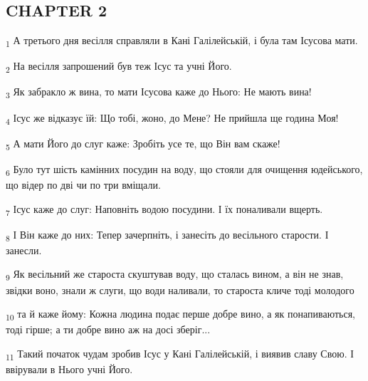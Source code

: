 \subsection{CHAPTER 2}
\begin{tcolorbox}
\textsubscript{1} А третього дня весілля справляли в Кані Галілейській, і була там Ісусова мати.
\end{tcolorbox}
\begin{tcolorbox}
\textsubscript{2} На весілля запрошений був теж Ісус та учні Його.
\end{tcolorbox}
\begin{tcolorbox}
\textsubscript{3} Як забракло ж вина, то мати Ісусова каже до Нього: Не мають вина!
\end{tcolorbox}
\begin{tcolorbox}
\textsubscript{4} Ісус же відказує їй: Що тобі, жоно, до Мене? Не прийшла ще година Моя!
\end{tcolorbox}
\begin{tcolorbox}
\textsubscript{5} А мати Його до слуг каже: Зробіть усе те, що Він вам скаже!
\end{tcolorbox}
\begin{tcolorbox}
\textsubscript{6} Було тут шість камінних посудин на воду, що стояли для очищення юдейського, що відер по дві чи по три вміщали.
\end{tcolorbox}
\begin{tcolorbox}
\textsubscript{7} Ісус каже до слуг: Наповніть водою посудини. І їх поналивали вщерть.
\end{tcolorbox}
\begin{tcolorbox}
\textsubscript{8} І Він каже до них: Тепер зачерпніть, і занесіть до весільного старости. І занесли.
\end{tcolorbox}
\begin{tcolorbox}
\textsubscript{9} Як весільний же староста скуштував воду, що сталась вином, а він не знав, звідки воно, знали ж слуги, що води наливали, то староста кличе тоді молодого
\end{tcolorbox}
\begin{tcolorbox}
\textsubscript{10} та й каже йому: Кожна людина подає перше добре вино, а як понапиваються, тоді гірше; а ти добре вино аж на досі зберіг...
\end{tcolorbox}
\begin{tcolorbox}
\textsubscript{11} Такий початок чудам зробив Ісус у Кані Галілейській, і виявив славу Свою. І ввірували в Нього учні Його.
\end{tcolorbox}
